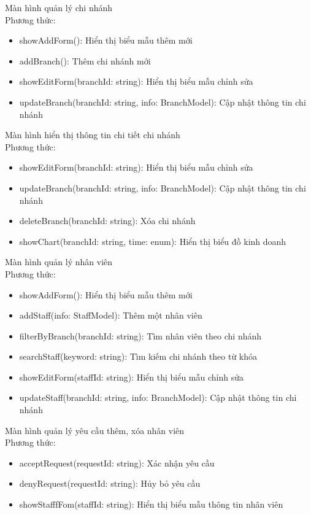 Màn hình quản lý chi nhánh\\
Phương thức:
\begin{itemize}
	\item showAddForm(): Hiển thị biểu mẫu thêm mới
	\item addBranch(): Thêm chi nhánh mới
	\item showEditForm(branchId: string): Hiển thị biểu mẫu chỉnh sửa
	\item updateBranch(branchId: string, info: BranchModel): Cập nhật thông tin chi nhánh
\end{itemize}

Màn hình hiển thị thông tin chi tiết chi nhánh\\
Phương thức:
\begin{itemize}
	\item showEditForm(branchId: string): Hiển thị biểu mẫu chỉnh sửa
	\item updateBranch(branchId: string, info: BranchModel): Cập nhật thông tin chi nhánh
	\item deleteBranch(branchId: string): Xóa chi nhánh
	\item showChart(branchId: string, time: enum): Hiển thị biểu đồ kinh doanh
\end{itemize}

Màn hình quản lý nhân viên\\
Phương thức:
\begin{itemize}
	\item showAddForm(): Hiển thị biểu mẫu thêm mới
	\item addStaff(info: StaffModel): Thêm một nhân viên
	\item filterByBranch(branchId: string): Tìm nhân viên theo chi nhánh
	\item searchStaff(keyword: string): Tìm kiếm chi nhánh theo từ khóa
	\item showEditForm(staffId: string): Hiển thị biểu mẫu chỉnh sửa
	\item updateStaff(branchId: string, info: BranchModel): Cập nhật thông tin chi nhánh
\end{itemize}

Màn hình quản lý yêu cầu thêm, xóa nhân viên\\
Phương thức:
\begin{itemize}
	\item acceptRequest(requestId: string): Xác nhận yêu cầu
	\item denyRequest(requestId: string): Hủy bỏ yêu cầu
	\item showStafffFom(staffId: string): Hiển thị biểu mẫu thông tin nhân viên
\end{itemize}



